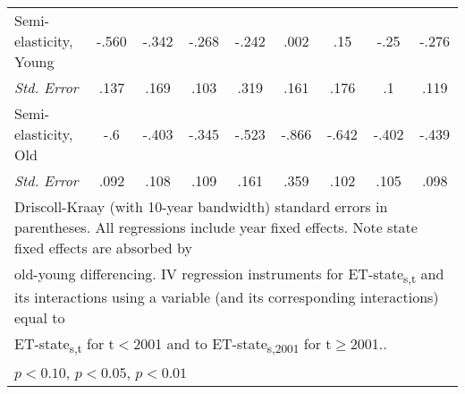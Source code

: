 {\begin{tabular}{l*{8}{c}}
Semi-elasticity, Young      &-.560         &    -.342         &    -.268         &    -.242         &     .002         &      .15         &     -.25         &    -.276         \\
\quad \textit{Std. Error}    &     .137         &     .169         &     .103         &     .319         &     .161         &     .176         &       .1         &     .119         \\
Semi-elasticity, Old        &      -.6         &    -.403         &    -.345         &-.523         &    -.866         &    -.642         &    -.402         &    -.439         \\
\quad \textit{Std. Error}      &     .092         &     .108         &     .109         &     .161         &     .359         &     .102         &     .105         &     .098         \\
\hline \hline
\multicolumn{9}{l}{\footnotesize Driscoll-Kraay (with 10-year bandwidth) standard errors in parentheses. All regressions include year fixed effects. Note state fixed effects are absorbed by} \\
\multicolumn{9}{l}{\footnotesize old-young differencing. IV regression instruments for ET-state\textsubscript{s,t} and its interactions using a variable (and its corresponding interactions) equal to} \\
\multicolumn{9}{l}{\footnotesize ET-state\textsubscript{s,t} for t$<$2001 and to ET-state\textsubscript{s,2001} for t$\geq$2001..} \\
\multicolumn{9}{l}{\footnotesize \sym{*} \(p<0.10\), \sym{**} \(p<0.05\), \sym{***} \(p<0.01\)}  \end{tabular} }
